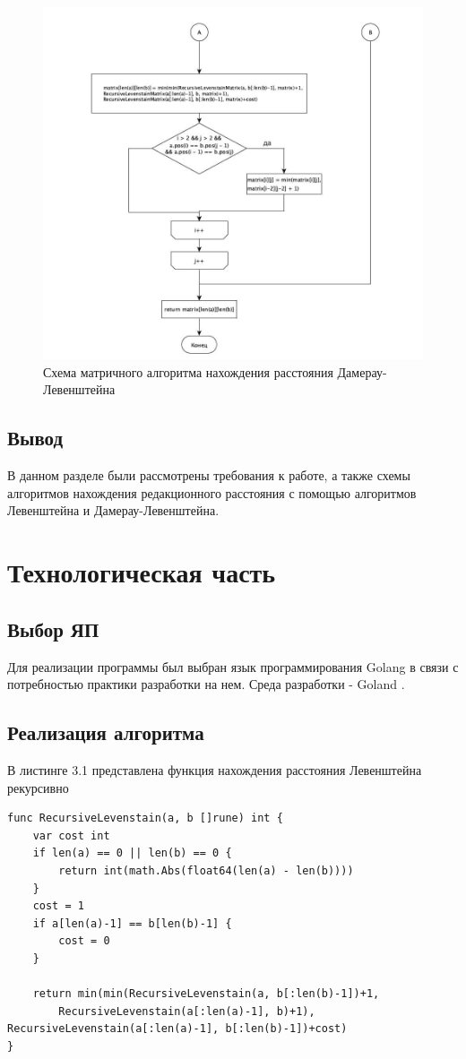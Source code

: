 \documentclass[12pt]{report}
\begin{document}
\begin{figure}[H]
    \centering
    \includegraphics[width=0.8\linewidth]{4_2.jpg}
    \caption{Схема матричного алгоритма нахождения расстояния Дамерау-Левенштейна}
    \label{fig:mpr}
\end{figure}
\newpage



\section*{Вывод}
В данном разделе были рассмотрены требования к работе, а также схемы алгоритмов нахождения редакционного расстояния с помощью алгоритмов Левенштейна и Дамерау-Левенштейна.
\chapter{Технологическая часть}
\section{Выбор ЯП}
Для реализации программы был выбран язык программирования Golang в связи с потребностью практики разработки на нем. Среда разработки - Goland .\cite{golang} \cite{vscode}

\section{Реализация алгоритма}

В листинге 3.1 представлена функция нахождения расстояния Левенштейна рекурсивно
\begin{lstlisting}[label=some-code,caption=Функция нахождения расстояния Левенштейна рекурсивно]
func RecursiveLevenstain(a, b []rune) int {
	var cost int
	if len(a) == 0 || len(b) == 0 {
		return int(math.Abs(float64(len(a) - len(b))))
	}
	cost = 1
	if a[len(a)-1] == b[len(b)-1] {
		cost = 0
	}

	return min(min(RecursiveLevenstain(a, b[:len(b)-1])+1,
		RecursiveLevenstain(a[:len(a)-1], b)+1), RecursiveLevenstain(a[:len(a)-1], b[:len(b)-1])+cost)
}
\end{lstlisting}
\end{document}

